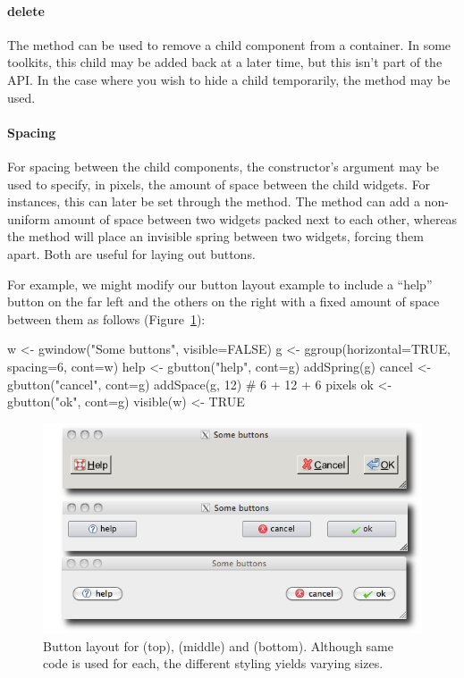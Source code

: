 \paragraph{delete}
The  method can be used to remove a child
component from a container. In some toolkits, this child may be
added back at a later time, but this isn't part of the API. In the
case where you wish to hide a child temporarily, the
 method may be used.





\paragraph{Spacing}
For spacing between the child components, the constructor's argument
 may be used to specify, in pixels, the
amount of space between the child widgets. For 
instances, this can later be set through the 
method. The method  can add a non-uniform
amount of space between two widgets packed next to each other, whereas
the method  will place an invisible spring
between two widgets, forcing them apart.  Both are useful for laying
out buttons.


For example, we might modify our button layout example to include a
``help'' button on the far left and the others on the right with a
fixed amount of space between them as follows (Figure~\ref{fig:gWidgets-button-layout}):
\begin{Schunk}
\begin{Sinput}
 w <- gwindow("Some buttons", visible=FALSE)
 g <- ggroup(horizontal=TRUE, spacing=6, cont=w)
 help <- gbutton("help", cont=g)
 addSpring(g)
 cancel <- gbutton("cancel", cont=g)
 addSpace(g, 12)                         # 6 + 12 + 6 pixels
 ok <- gbutton("ok", cont=g)
 visible(w) <- TRUE
\end{Sinput}
\end{Schunk}


\begin{figure}
  \centering
  \includegraphics[width=.7\textwidth]{fig-gWidgets-buttons}
  \caption{Button layout for  (top),  (middle) and  (bottom). Although same code is used for each, the different styling yields varying sizes. }
  \label{fig:gWidgets-button-layout}
\end{figure}

